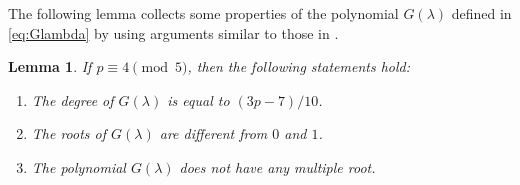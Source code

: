 \documentclass[10pt,a4paper]{amsart}
\newtheorem{Lem}[Def]{Lemma}
\begin{document}
\newpage
The following lemma collects some properties of the polynomial $G(\lambda)$ defined in \eqref{eq:Glambda} by using arguments similar to those in \cite[Section 1.4]{IKO}.\vspace{-1.3mm}
\begin{Lem}\label{lem:simple_for_type6}
If $p \equiv 4 \pmod{5}$, then the following statements hold:\vspace{-1.1mm}
\begin{enumerate}
\item[(1)] The degree of $G(\lambda)$ is equal to $(3p-7)/10$.\vspace{-2.6mm}
\item[(2)] The roots of $G(\lambda)$ are different from $0$ and $1$.\vspace{-2.6mm}
\item[(3)] The polynomial $G(\lambda)$ does not have any multiple root.\vspace{-0.3mm}
\end{enumerate}
\end{Lem}
\end{document}
